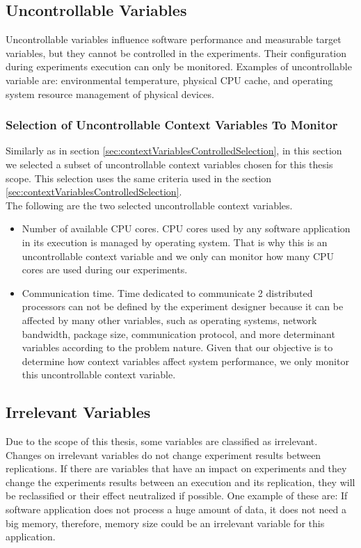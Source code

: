 \subsection{Uncontrollable Variables}
Uncontrollable variables influence software performance and measurable target variables, but they cannot be controlled in the experiments. Their configuration during experiments execution can only be monitored. Examples of uncontrollable variable are: environmental temperature, physical CPU cache, and operating system resource management of physical devices.

\subsubsection{Selection of Uncontrollable Context Variables To Monitor}
Similarly as in section \ref{sec:contextVariablesControlledSelection}, in this section we selected a subset of uncontrollable context variables chosen for this thesis scope. This selection uses the same criteria used in the section \ref{sec:contextVariablesControlledSelection}. \\

The following are the two selected uncontrollable context variables.
 
\begin{itemize}
	\item Number of available CPU cores.
		CPU cores used by any software application in its execution is managed by operating system. That is why this is an uncontrollable context variable and we only can monitor how many CPU cores are used during our experiments.
	\item Communication time.
		Time dedicated to communicate 2 distributed processors can not be defined by the experiment designer because it can be affected by many other variables, such as operating systems, network bandwidth, package size, communication protocol, and more determinant variables according to the problem nature. Given that our objective is to determine how context variables affect system performance, we only monitor this uncontrollable context variable.
\end{itemize}

\subsection{Irrelevant Variables}
Due to the scope of this thesis, some variables are classified as irrelevant. Changes on irrelevant variables do not change experiment results between replications. If there are variables that have an impact on experiments and they change the experiments results between an execution and its replication, they will be reclassified or their effect neutralized if possible. One example of these are: If software application does not process a huge amount of data, it does not need a big memory, therefore, memory size could be an irrelevant variable for this application.

